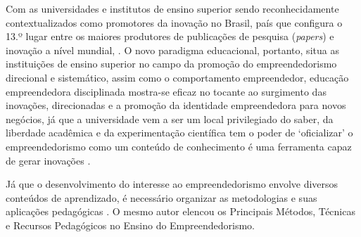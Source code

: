 Com as universidades e institutos de ensino superior sendo reconhecidamente contextualizados como promotores da inovação no Brasil, país que configura o 13.º lugar entre os maiores produtores de publicações de pesquisa (\textit{papers}) e inovação a nível mundial, . 
O novo paradigma educacional, portanto, situa as instituições de ensino superior no campo da promoção do empreendedorismo direcional e sistemático, assim como o comportamento empreendedor, educação empreendedora disciplinada mostra-se eficaz no tocante ao surgimento das inovações, direcionadas e a promoção da identidade empreendedora para novos negócios, \cite{jain_academics_2009} já que a universidade vem a ser um local privilegiado do saber, da liberdade acadêmica e da experimentação científica tem o poder de ‘oficializar’ o empreendedorismo como um conteúdo de conhecimento é uma ferramenta capaz de gerar inovações \cite{dolabela_oficina_2008}. 

Já que o desenvolvimento do interesse ao empreendedorismo envolve diversos conteúdos de aprendizado, é necessário organizar as metodologias e suas aplicações pedagógicas \cite{rocha_avaliacao_2014}. O mesmo autor elencou os Principais Métodos, Técnicas e Recursos Pedagógicos no Ensino do Empreendedorismo. 


